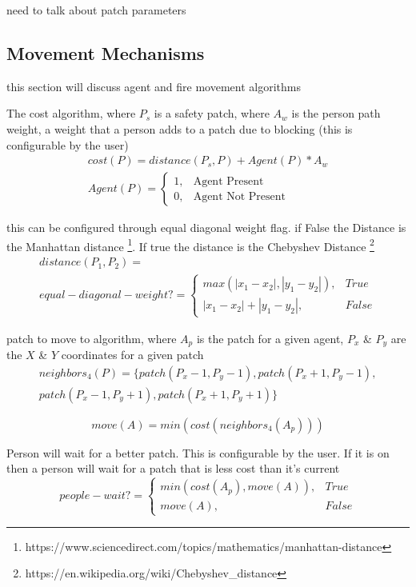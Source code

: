 \documentclass[12pt,letterpaper]{article}
\begin{document}
need to talk about patch parameters
\subsection{Movement Mechanisms}
this section will discuss agent and fire movement algorithms

The cost algorithm, where $P_s$ is a safety patch, where $A_w$ is the person path weight, a weight that a person adds to a patch due to blocking (this is configurable by the user)
\begin{align}
cost(P)  = distance(P_s, P) + Agent(P) * A_w \nonumber \\
Agent(P)=
\begin{cases}
1, & \text{Agent Present}  \\
0, & \text{Agent Not Present} 
\end{cases}
\end{align}

this can be configured through equal diagonal weight flag. if False the Distance is the Manhattan distance \footnote{ https://www.sciencedirect.com/topics/mathematics/manhattan-distance}. If true the distance is the Chebyshev Distance \footnote{https://en.wikipedia.org/wiki/Chebyshev\_distance}
\begin{align}
distance(P_1, P_2)  = \nonumber\\
equal-diagonal-weight?=
\begin{cases}
	max(|x_1-x_2|, |y_1-y_2|), & True \\
	|x_1-x_2|+ |y_1-y_2|, & False
\end{cases}
\end{align}


patch to move to algorithm, where $A_p$ is the patch for a given agent, $P_x$ \& $P_y$ are the $X$ \& $Y$ coordinates for a given patch
\begin{align}
neighbors_4 (P)  = \{patch(P_x - 1, P_y -1), patch(P_x + 1, P_y -1), \nonumber \\ 
patch(P_x - 1, P_y + 1),patch(P_x + 1, P_y + 1)\}   
\end{align}

\begin{equation}
move(A) = min(cost(neighbors_4 (A_p)))
\end{equation}

Person will wait for a better patch.  This is configurable by the user. If it is on then a person will wait for a patch that is less cost than it's current
\begin{equation}
people-wait?=
\begin{cases}
min(cost(A_p), move(A)), & True\\
move(A), & False
\end{cases}
\end{equation}
\end{document}
